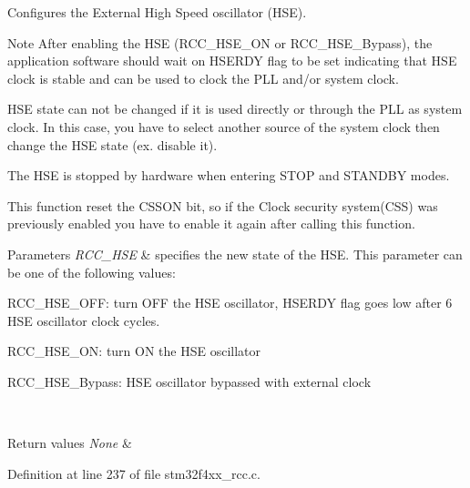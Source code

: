 Configures the External High Speed oscillator (H\+SE). 

\begin{DoxyNote}{Note}
After enabling the H\+SE (R\+C\+C\+\_\+\+H\+S\+E\+\_\+\+ON or R\+C\+C\+\_\+\+H\+S\+E\+\_\+\+Bypass), the application software should wait on H\+S\+E\+R\+DY flag to be set indicating that H\+SE clock is stable and can be used to clock the P\+LL and/or system clock. 

H\+SE state can not be changed if it is used directly or through the P\+LL as system clock. In this case, you have to select another source of the system clock then change the H\+SE state (ex. disable it). 

The H\+SE is stopped by hardware when entering S\+T\+OP and S\+T\+A\+N\+D\+BY modes. 

This function reset the C\+S\+S\+ON bit, so if the Clock security system(\+C\+S\+S) was previously enabled you have to enable it again after calling this function. 
\end{DoxyNote}

\begin{DoxyParams}{Parameters}
{\em R\+C\+C\+\_\+\+H\+SE} & specifies the new state of the H\+SE. This parameter can be one of the following values\+: \begin{DoxyItemize}
\item R\+C\+C\+\_\+\+H\+S\+E\+\_\+\+O\+FF\+: turn O\+FF the H\+SE oscillator, H\+S\+E\+R\+DY flag goes low after 6 H\+SE oscillator clock cycles. \item R\+C\+C\+\_\+\+H\+S\+E\+\_\+\+ON\+: turn ON the H\+SE oscillator \item R\+C\+C\+\_\+\+H\+S\+E\+\_\+\+Bypass\+: H\+SE oscillator bypassed with external clock \end{DoxyItemize}
\\
\hline
\end{DoxyParams}

\begin{DoxyRetVals}{Return values}
{\em None} & \\
\hline
\end{DoxyRetVals}


Definition at line 237 of file stm32f4xx\+\_\+rcc.\+c.

\mbox{\label{group___r_c_c___group1_ga0c6772a1e43765909495f57815ef69e2}} 
